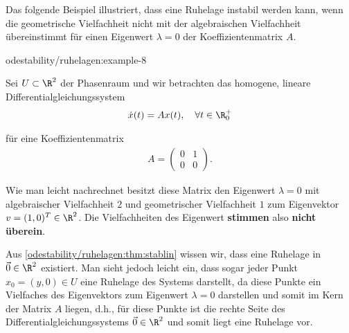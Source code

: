 \documentclass[letterpaper,10pt,english]{jupyterBook}
\begin{document}
\par
Das folgende Beispiel illustriert, dass eine Ruhelage instabil werden kann, wenn die geometrische Vielfachheit nicht mit der algebraischen Vielfachheit übereinstimmt für einen Eigenwert \(\lambda =0\) der Koeffizientenmatrix \(A\).
\begin{example}{}{odestability/ruhelagen:example-8}



\par
Sei \(U \subset \R^2\) der Phasenraum und wir betrachten das homogene, lineare Differentialgleichungssystem
\begin{align*}
\dot{x}(t) = A x(t), \quad \forall t \in \R_0^+
\end{align*}
\par
für eine Koeffizientenmatrix
\begin{align*}
A = \begin{pmatrix} 0&1\\0&0\end{pmatrix}.
\end{align*}
\par
Wie man leicht nachrechnet besitzt diese Matrix den Eigenwert \(\lambda = 0\) mit algebraischer Vielfachheit \(2\) und geometrischer Vielfachheit \(1\) zum Eigenvektor \(v = (1,0)^T \in \R^2\).
Die Vielfachheiten des Eigenwert \textbf{stimmen} also \textbf{nicht überein}.

\par
Aus \cref{odestability/ruhelagen:thm:stablin} wissen wir, dass eine Ruhelage in \(\vec{0} \in \R^2\) existiert.
Man sieht jedoch leicht ein, dass sogar jeder Punkt \(x_0 = (y, 0) \in U\) eine Ruhelage des Systems darstellt, da diese Punkte ein Vielfaches des Eigenvektors zum Eigenwert \(\lambda = 0\) darstellen und somit im Kern der Matrix \(A\) liegen, d.h., für diese Punkte ist die rechte Seite des Differentialgleichungssystems \(\vec{0} \in \R^2\) und somit liegt eine Ruhelage vor.


\end{example}
\end{document}
